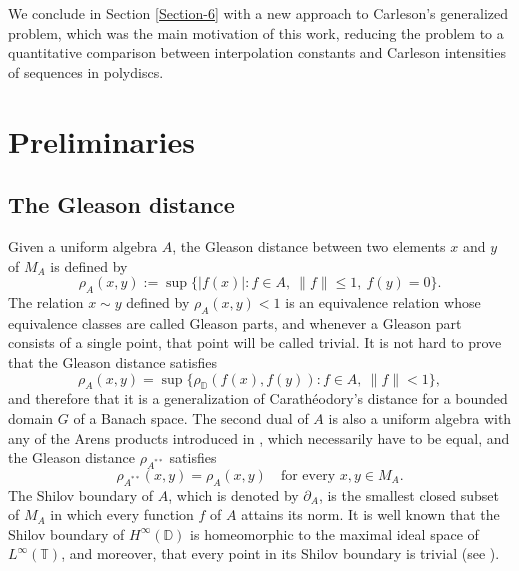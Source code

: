 \documentclass[preprint,12pt,number]{elsarticle}
\newcommand{\D}{\mathbb{D}}
\newcommand{\T}{\mathbb{T}}
\begin{document}
We conclude in Section \ref{Section-6} with a new approach to Carleson's generalized problem, which was the main motivation of this work, reducing the problem to a quantitative comparison between interpolation constants and Carleson intensities of sequences in polydiscs.

\section{Preliminaries}\label{Preliminaries}

\vspace{0.3cm}
\subsection{The Gleason distance}
\vspace{0.3cm}
Given a uniform algebra $A$, the Gleason distance between two elements $x$ and $y$ of $M_A$ is defined by 
\[
\rho_A(x,y):=\sup\{ |f(x)|: f\in A, \ \lVert f \rVert\leq 1, \ f(y)=0 \}.
\] 
The relation $x\sim y$ defined by $\rho_A(x,y)<1$ is an equivalence relation whose equivalence classes are called Gleason parts, and whenever a Gleason part consists of a single point, that point will be called trivial. It is not hard to prove that the Gleason distance satisfies 
\begin{equation}\label{Gleason-equality}
    \rho_A(x,y)=\sup\{ \rho_\D(f(x),f(y)): f\in A, \ \lVert f \rVert< 1 \},
\end{equation} 
and therefore that it is a generalization of Carathéodory's distance for a bounded domain $G$ of a Banach space. The second dual of $A$ is also a uniform algebra with any of the Arens products introduced in \cite{Arens1951}, which necessarily have to be equal, and the Gleason distance $\rho_{A^{**}}$ satisfies 
\[
\rho_{A^{**}}(x,y)=\rho_A(x,y)\quad \text{for every } x,y\in M_A.
\] 
The Shilov boundary of $A$, which is denoted by $\partial_A$, is the smallest closed subset of $M_A$ in which every function $f$ of $A$ attains its norm. It is well known that the Shilov boundary of $H^\infty(\D)$ is homeomorphic to the maximal ideal space of $L^\infty(\T)$, and moreover, that every point in its Shilov boundary is trivial (see \cite{Garnett1981}).
\end{document}
